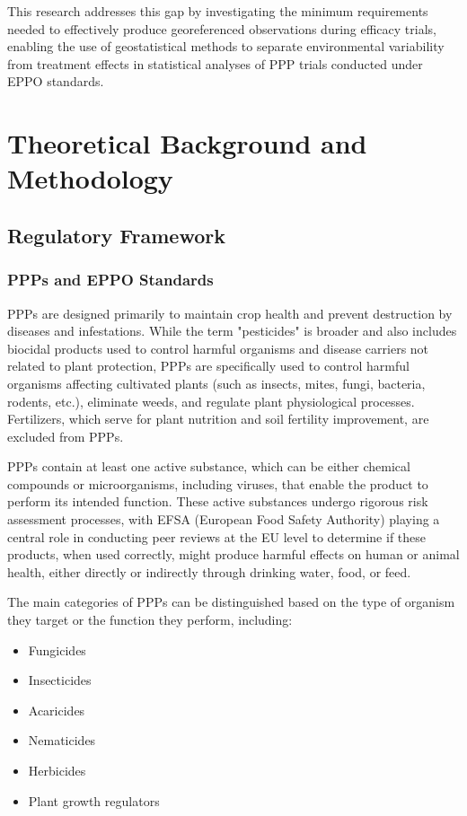 \documentclass[12pt,a4paper,oneside]{report}
\begin{document}
This research addresses this gap by investigating the minimum requirements needed to effectively produce georeferenced observations during efficacy trials, enabling the use of geostatistical methods to separate environmental variability from treatment effects in statistical analyses of PPP trials conducted under EPPO standards.

\chapter{Theoretical Background and Methodology}

\section{Regulatory Framework}

\subsection{PPPs and EPPO Standards}
PPPs are designed primarily to maintain crop health 
and prevent destruction by diseases and infestations. While the term "pesticides" 
is broader and also includes biocidal products used to control harmful organisms 
and disease carriers not related to plant protection, PPPs are 
specifically used to control harmful organisms affecting cultivated plants (such 
as insects, mites, fungi, bacteria, rodents, etc.), eliminate weeds, and regulate 
plant physiological processes. Fertilizers, which serve for plant nutrition and 
soil fertility improvement, are excluded from PPPs.

PPPs contain at least one active substance, which can be either 
chemical compounds or microorganisms, including viruses, that enable the product 
to perform its intended function. These active substances undergo rigorous risk 
assessment processes, with EFSA (European Food Safety Authority) playing a central 
role in conducting peer reviews at the EU level to determine if these products, 
when used correctly, might produce harmful effects on human or animal health, either 
directly or indirectly through drinking water, food, or feed.

The main categories of PPPs can be distinguished based on the 
type of organism they target or the function they perform, including:

\begin{itemize}
    \item Fungicides
    \item Insecticides
    \item Acaricides
    \item Nematicides
    \item Herbicides
    \item Plant growth regulators
\end{itemize}
\end{document}
